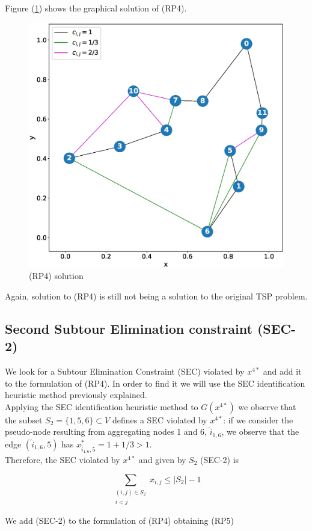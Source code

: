 \documentclass[12pt]{article}
\begin{document}
Figure (\ref{ff8}) shows the graphical solution of (RP4).
\begin{figure}[H]
\centering
    \includegraphics[width=0.7\linewidth]{ff1.eps} 
  \caption{(RP4) solution}
  \label{ff8}
\end{figure}
Again, solution to (RP4) is still not being a solution to the original TSP problem.

\subsection{Second Subtour Elimination constraint (SEC-2)}
We look for a Subtour Elimination Constraint (SEC) violated by $x^{4*}$ and add it to the formulation of (RP4).  In order to find it we will use the SEC identification heuristic method previously explained.\\

Applying the SEC identification heuristic method to $G(x^{4*})$ we observe that the subset $S_{2} = \{1,5,6\} \subset V$ defines a SEC violated by $x^{4*}$: if we consider the pseudo-node resulting from aggregating nodes 1 and 6, $\hat{i}_{1,6}$, we observe that the edge $(\hat{i}_{1,6},5)$ has $x_{\hat{i}_{1,6},5}^{*} = 1 + 1/3 > 1$. \\

Therefore, the SEC violated by $x^{4*}$ and given by $S_{2}$ (SEC-2) is

\begin{equation}
    \sum_{\substack{(i,j) \in S_{2}\\i<j}}x_{i,j} \leq |S_{2}|-1  \tag{SEC-2}
\end{equation}

We add (SEC-2) to the formulation of (RP4) obtaining (RP5)
\end{document}
